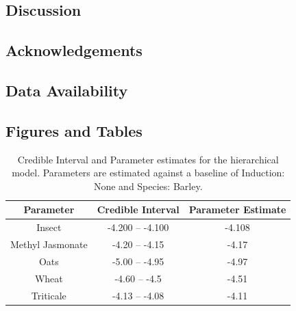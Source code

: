 \documentclass[12pt, letterpaper, ]{article}
\begin{document}
\subsection{Discussion}

\subsection{Acknowledgements}

\subsection{Data Availability}

\subsection{Figures and Tables}

\begin{table}[h]
        \centering
        \caption{Credible Interval and Parameter estimates for the hierarchical model. Parameters are estimated against a baseline of Induction: None and Species: Barley.}
        \label{Tab:params}
        \begin{tabular} { c | c | c }
                \hline
                Parameter & Credible Interval & Parameter Estimate \\
                \hline
                Insect & -4.200 -- -4.100 & -4.108 \\
                Methyl Jasmonate & -4.20 -- -4.15 & -4.17 \\
                Oats & -5.00 -- -4.95 & -4.97 \\
                Wheat & -4.60 -- -4.5 & -4.51 \\
                Triticale & -4.13 -- -4.08 & -4.11 \\
                \hline
        \end{tabular}
\end{table}
\end{document}
